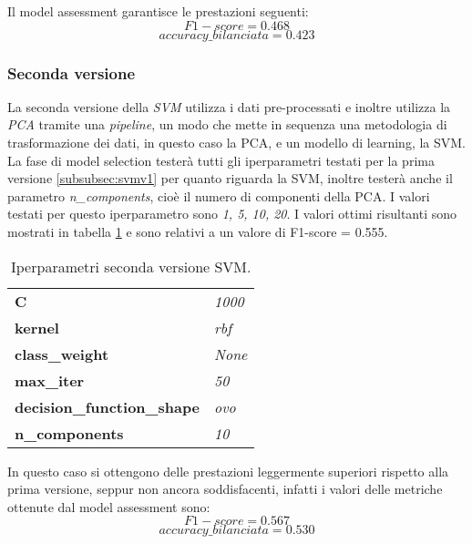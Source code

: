 Il model assessment garantisce le prestazioni seguenti:
$$F1-score = 0.468$$
$$accuracy\_bilanciata = 0.423$$

\subsubsection{Seconda versione}\label{subsubsec:svmv2}
La seconda versione della \textit{SVM} utilizza i dati pre-processati e inoltre utilizza la \textit{PCA} tramite una \textit{pipeline}, un modo che mette in sequenza una metodologia di trasformazione dei dati, in questo caso la PCA, e un modello di learning, la SVM. La fase di model selection testerà tutti gli iperparametri testati per la prima versione \ref{subsubsec:svmv1} per quanto riguarda la SVM, inoltre testerà anche il parametro \textit{n\_components}, cioè il numero di componenti della PCA. I valori testati per questo iperparametro sono \textit{1, 5, 10, 20}.
I valori ottimi risultanti sono mostrati in tabella \ref{tab:svmv2} e sono relativi a un valore di F1-score = 0.555.

\begin{table}[h] 
\centering
\begin{tabular}{l l}
\hline
\textbf{C} & \textit{1000}\\
\textbf{kernel} & \textit{rbf}\\
\textbf{class\_weight} & \textit{None}\\
\textbf{max\_iter} & \textit{50}\\
\textbf{decision\_function\_shape} & \textit{ovo}\\
\textbf{n\_components} & \textit{10}\\
\hline
\end{tabular}
\caption{Iperparametri seconda versione SVM.}
\label{tab:svmv2}
\end{table}

In questo caso si ottengono delle prestazioni leggermente superiori rispetto alla prima versione,  seppur non ancora soddisfacenti, infatti i valori delle metriche ottenute dal model assessment sono:
$$F1-score = 0.567$$
$$accuracy\_bilanciata = 0.530$$

